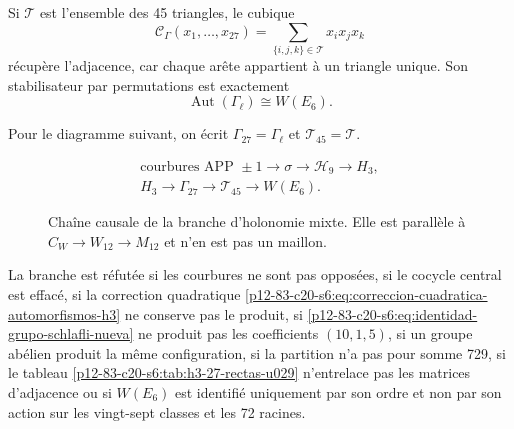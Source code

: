 Si \(\mathcal T\) est l’ensemble des 45 triangles, le cubique
\[
 \mathcal C_\Gamma(x_1,\ldots,x_{27})
 =\sum_{\{i,j,k\}\in\mathcal T}x_ix_jx_k
\]
récupère l'adjacence, car chaque arête appartient à un triangle unique. Son stabilisateur par permutations est exactement
\[
 \operatorname{Aut}(\Gamma_\ell)\cong W(E_6).
\]

Pour le diagramme suivant, on écrit
\(\Gamma_{27}=\Gamma_\ell\) et \(\mathcal T_{45}=\mathcal T\).

\begin{figure}[htbp]
\centering
\[
 \begin{gathered}
 \text{courbures APP }\pm1
 \longrightarrow\sigma
 \longrightarrow\mathcal H_9
 \longrightarrow H_3,\\[3pt]
 H_3
 \longrightarrow\Gamma_{27}
 \longrightarrow\mathcal T_{45}
 \longrightarrow W(E_6).
 \end{gathered}
\]
\caption{Chaîne causale de la branche d’holonomie mixte. Elle est parallèle à
\(C_W\to W_{12}\to M_{12}\) et n’en est pas un maillon.}
\label{p12-83-c20-s6:fig:cadena-holonomia-e6-u029}
\end{figure}

\begin{criterion}
\label{p12-83-c20-s6:crit:refutacion-rama-e6-u029}
La branche est réfutée si les courbures ne sont pas opposées, si le cocycle
central est effacé, si la correction quadratique
\eqref{p12-83-c20-s6:eq:correccion-cuadratica-automorfismos-h3} ne conserve pas le produit,
si \eqref{p12-83-c20-s6:eq:identidad-grupo-schlafli-nueva} ne produit pas les coefficients
\((10,1,5)\), si un groupe abélien produit la même configuration, si la
partition n’a pas pour somme 729, si le tableau
\ref{p12-83-c20-s6:tab:h3-27-rectas-u029} n’entrelace pas les matrices d’adjacence ou si
\(W(E_6)\) est identifié uniquement par son ordre et non par son action sur les
vingt-sept classes et les 72 racines.

\end{criterion}
